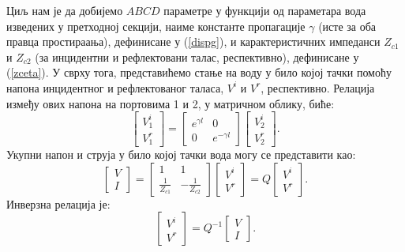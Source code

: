\documentclass[main.tex]{subfiles}
\begin{document}
Циљ нам је да добијемо $ABCD$ параметре у функцији од параметара вода изведених у претходној секцији, наиме константе пропагације $\gamma$ (исте за оба правца простираања), дефинисане у (\ref{dispg}), и карактеристичних импеданси $Z_{c1}$ и $Z_{c2}$ (за инцидентни и рефлектовани талас, респективно), дефинисане у (\ref{zceta}). У сврху тога, представићемо стање на воду у било којој тачки помоћу напона инцидентног и рефлектованог таласа, $V^i$ и $V^r$, респективно. Релација између ових напона на портовима 1 и 2, у матричном облику, биће:
\begin{equation}\label{modal_basis}
\begin{bmatrix} V^i_1 \\ V^r_1 \end{bmatrix} =
\begin{bmatrix} e^{\gamma l} & 0 \\ 0 & e^{-\gamma l} \end{bmatrix}
\begin{bmatrix} V^i_2 \\ V^r_2 \end{bmatrix}.
\end{equation}
Укупни напон и струја у било којој тачки вода могу се представити као:
\begin{equation}\label{slicnost}
\begin{bmatrix} V \\ I \end{bmatrix} =
\begin{bmatrix} 1 & 1 \\ \frac{1}{Z_{c1}} & -\frac{1}{Z_{c2}} \end{bmatrix}
\begin{bmatrix} V^i \\ V^r \end{bmatrix} = 
Q\begin{bmatrix} V^i \\ V^r \end{bmatrix}.
\end{equation}
Инверзна релација је:
\begin{equation}\label{slicnost2}
\begin{bmatrix} V^i \\ V^r \end{bmatrix} =
Q^{-1}\begin{bmatrix} V \\ I \end{bmatrix}.
\end{equation}
\end{document}
